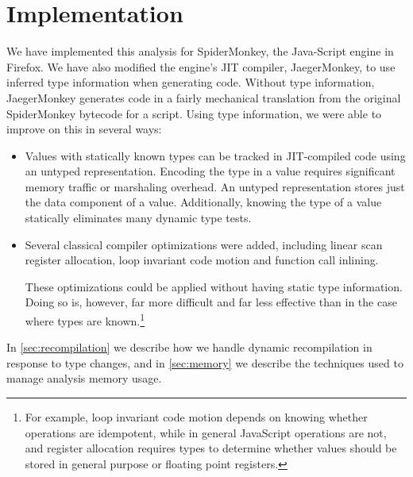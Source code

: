 
\section{Implementation}
\label{sec:implementation}

We have implemented this analysis for SpiderMonkey, the Java-Script engine
in Firefox.
We have also modified the engine's JIT compiler, JaegerMonkey, to use
inferred type information when generating code.
Without type information, JaegerMonkey generates code in a fairly mechanical
translation from the original SpiderMonkey bytecode for a script.
Using type information, we were able to improve on this in several ways:

\begin{itemize}

\item Values with statically known types can be tracked in JIT-compiled code
using an untyped representation.
Encoding the type in a value requires significant memory traffic or
marshaling overhead.
An untyped representation stores just the data component of a value.
Additionally, knowing the type of a value statically eliminates many
dynamic type tests.

\item Several classical compiler optimizations were added,
including linear scan register allocation, loop invariant code motion
and function call inlining.

These optimizations could be applied without
having static type information.
Doing so is, however, far more difficult and far less effective than in
the case where types are known.\footnote{For example, loop invariant code motion depends
on knowing whether operations
are idempotent, while in general JavaScript operations are not,
and register allocation requires types to determine whether values should
be stored in general purpose or floating point registers.}

\end{itemize}

In \Section\ref{sec:recompilation} we describe how we handle dynamic recompilation in
response to type changes, and in \Section\ref{sec:memory} we describe the techniques
used to manage analysis memory usage.

